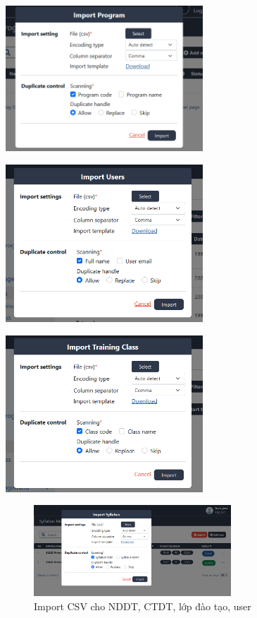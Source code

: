 \documentclass[report.tex]{subfiles}
\begin{document}
{\centering
\includegraphics[width=280px]{../meta/ui.program-import.png}
\par
}
{\centering
\includegraphics[width=280px]{../meta/ui.user-import.png}
\par
}
{\centering
\includegraphics[width=280px]{../meta/ui.class-import.png}
\par
}

\begin{figure}[!htb]
{\centering
\includegraphics[width=280px]{../meta/ui.syllabus-import.png}
\caption{Import CSV cho NDDT, CTDT, lớp đào tạo, user}
\par
}
\end{figure}
\FloatBarrier
\end{document}
